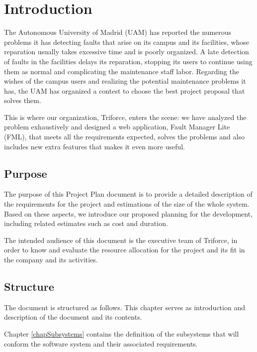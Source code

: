 \documentclass[11pt]{report}
\begin{document}
\tableofcontents
\newpage
\listoftables
\newpage

\pagestyle{plain}

\chapter{Introduction}
\label{chapIntroduction}

The Autonomous University of Madrid (UAM) has reported the numerous problems it has detecting faults that arise on its campus and its facilities, whose reparation usually takes excessive time and is poorly organized. A late detection of faults in the facilities delays its reparation, stopping its users to continue using them as normal and complicating the maintenance staff labor. Regarding the wishes of the campus users and realizing the potential maintenance problems it has, the UAM has organized a contest to choose the best project proposal that solves them.

This is where our organization, Triforce, enters the scene: we have analyzed the problem exhaustively and designed a web application, Fault Manager Lite (FML), that meets all the requirements expected, solves the problems and also includes new extra features that makes it even more useful.

\section{Purpose}

The purpose of this Project Plan document is to provide a detailed description of the requirements for the project and estimations of the size of the whole system. Based on these aspects, we introduce our proposed planning for the development, including related estimates such as cost and duration.

The intended audience of this document is the executive team of Triforce, in order to know and evaluate the resource allocation for the project and its fit in the company and its activities.

\section{Structure}

The document is structured as follows. This chapter serves as introduction and description of the document and its contents. 

Chapter \ref{chapSubsystems} contains the definition of the subsystems that will conform the software system and their associated requirements.
\end{document}
